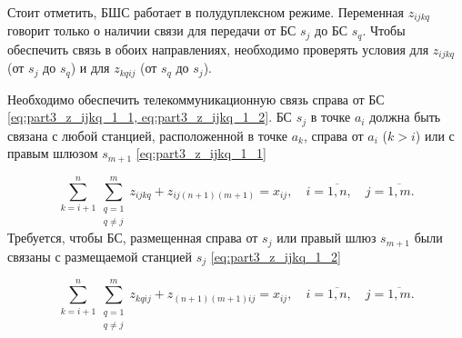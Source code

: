 


Стоит отметить, БШС работает в полудуплексном режиме. Переменная $z_{ijkq}$ говорит только о наличии связи для передачи от БС $s_j$ до БС $s_q$. Чтобы обеспечить связь в обоих направлениях, необходимо проверять условия для  $z_{ijkq}$ (от $s_j$ до $s_q$) и для $z_{kqij}$ (от $s_q$ до $s_j$).

Необходимо обеспечить телекоммуникационную связь справа от БС \cref{eq:part3_z_ijkq_1_1, eq:part3_z_ijkq_1_2}. БС $ s_j $ в точке $ a_i $ должна быть связана с  любой станцией, расположенной в точке $ a_k $, справа от $ a_i $ ($ k> i $) или с правым шлюзом $ s_{m + 1} $ \cref{eq:part3_z_ijkq_1_1} 

\begin{equation}
  \label{eq:part3_z_ijkq_1_1}
  \sum\limits_{k=i+1}^{n} \sum\limits_{\substack{q = 1\\ q \neq j}}^m z_{ijkq} + z_{ij(n+1)(m+1)} = x_{ij} ,  \quad i = \overline{1, n}, \quad j = \overline{1, m}.
\end{equation}
Требуется, чтобы БС, размещенная справа от $s_j$ или правый шлюз $ s_{m + 1} $  были связаны с размещаемой станцией $ s_j $ \cref{eq:part3_z_ijkq_1_2}

\begin{equation}
  \label{eq:part3_z_ijkq_1_2}
  \sum\limits_{k=i+1}^{n} \sum\limits_{\substack{q = 1\\ q \neq j}}^m z_{kqij} + z_{(n+1)(m+1)ij} = x_{ij} ,  \quad i = \overline{1, n}, \quad j = \overline{1, m}.
\end{equation}

